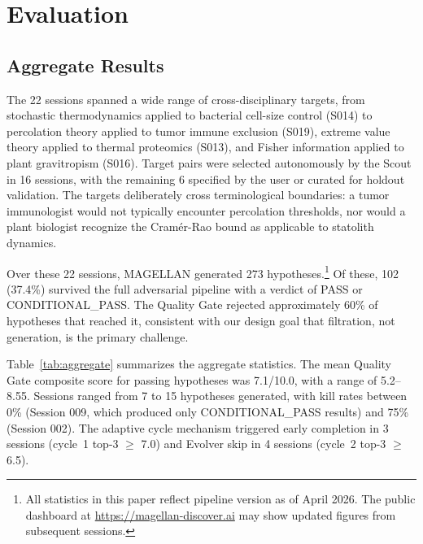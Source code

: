 \section{Evaluation}
\label{sec:evaluation}

\subsection{Aggregate Results}
\label{sec:aggregate}

The 22 sessions spanned a wide range of cross-disciplinary targets, from stochastic thermodynamics applied to bacterial cell-size control (S014) to percolation theory applied to tumor immune exclusion (S019), extreme value theory applied to thermal proteomics (S013), and Fisher information applied to plant gravitropism (S016). Target pairs were selected autonomously by the Scout in 16 sessions, with the remaining 6 specified by the user or curated for holdout validation. The targets deliberately cross terminological boundaries: a tumor immunologist would not typically encounter percolation thresholds, nor would a plant biologist recognize the Cram\'{e}r-Rao bound as applicable to statolith dynamics.

Over these 22 sessions, MAGELLAN generated 273 hypotheses.\footnote{All statistics in this paper reflect pipeline version as of April 2026. The public dashboard at \url{https://magellan-discover.ai} may show updated figures from subsequent sessions.} Of these, 102 (37.4\%) survived the full adversarial pipeline with a verdict of PASS or CONDITIONAL\_PASS. The Quality Gate rejected approximately 60\% of hypotheses that reached it, consistent with our design goal that filtration, not generation, is the primary challenge.

Table~\ref{tab:aggregate} summarizes the aggregate statistics. The mean Quality Gate composite score for passing hypotheses was 7.1/10.0, with a range of 5.2--8.55. Sessions ranged from 7 to 15 hypotheses generated, with kill rates between 0\% (Session 009, which produced only CONDITIONAL\_PASS results) and 75\% (Session 002). The adaptive cycle mechanism triggered early completion in 3 sessions (cycle~1 top-3 $\geq$ 7.0) and Evolver skip in 4 sessions (cycle~2 top-3 $\geq$ 6.5).

